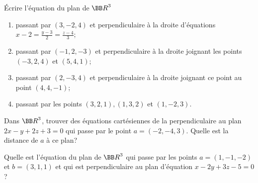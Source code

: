 \documentclass[12pt,french,oneside,a4paper]{memoir} %
\begin{document}
\begin{exo}
Écrire l'équation du plan de ${\BB R}^3$
\begin{enumerate}
\item passant par $(3,-2,4)$ et perpendiculaire à la droite d'équations 
$\displaystyle{x-2 = \frac{y-3}{2} = \frac{z-4}{3}}$; 
\item passant par $(-1,2,-3)$ et perpendiculaire à la droite joignant les 
points $(-3,2,4)$ et $(5,4,1)$; 
\item passant par $(2,-3,4)$ et perpendiculaire à la droite joignant
ce point au point $(4,4,-1)$;
\item passant par les points $(3,2,1), (1,3,2)$ et $(1,-2,3)$.
\end{enumerate}
\end{exo}

\begin{exo}
Dans ${\BB R}^3$, trouver des équations cartésiennes de la perpendiculaire au plan $2x-y+2z+3=0$ qui 
passe par le point $a=(-2,-4,3)$. Quelle est la distance de $a$ à ce plan?
\end{exo}

\begin{exo}
Quelle est l'équation du plan de ${\BB R}^3$ qui passe par les points $a=(1,-1,-2)$ et $b=(3,1,1)$ 
et qui est perpendiculaire au plan d'équation $x-2y+3z-5=0$ ?
\end{exo}
\end{document}
